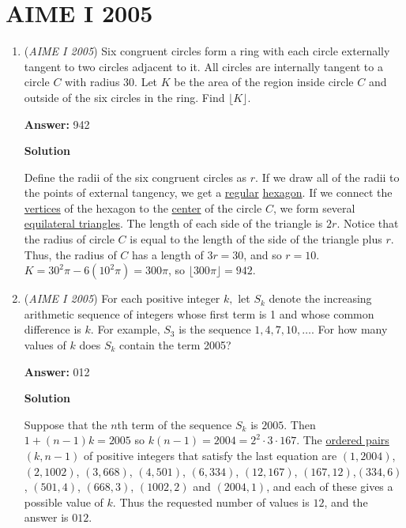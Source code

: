 \section{AIME I 2005}
        \begin{enumerate}
        	\item (\textit{AIME I 2005}) Six congruent circles form a ring with each circle externally tangent to two circles adjacent to it. All circles are internally tangent to a circle $C$ with radius 30. Let $K$ be the area of the region inside circle $C$ and outside of the six circles in the ring. Find $\lfloor K \rfloor.$

 \textbf{Answer: }942



\textbf{Solution}

Define the radii of the six congruent circles as $r$. If we draw all of the radii to the points of external tangency, we get a \href{https://artofproblemsolving.com/wiki/index.php?title=Regular\_polygon}{regular} \href{https://artofproblemsolving.com/wiki/index.php?title=Hexagon}{hexagon}. If we connect the \href{https://artofproblemsolving.com/wiki/index.php?title=Vertex}{vertices} of the hexagon to the \href{https://artofproblemsolving.com/wiki/index.php?title=Center}{center} of the circle $C$, we form several \href{https://artofproblemsolving.com/wiki/index.php?title=Equilateral\_triangle}{equilateral triangles}. The length of each side of the triangle is $2r$. Notice that the radius of circle $C$ is equal to the length of the side of the triangle plus $r$. Thus, the radius of $C$ has a length of $3r = 30$, and so $r = 10$. $K = 30^2\pi - 6(10^2\pi) = 300\pi$, so $\lfloor 300\pi \rfloor = \boxed{942}$.

 


	\item (\textit{AIME I 2005}) For each positive integer $k,$ let $S_k$ denote the increasing arithmetic sequence of integers whose first term is 1 and whose common difference is $k.$ For example, $S_3$ is the sequence $1,4,7,10,\ldots.$ For how many values of $k$ does $S_k$ contain the term 2005?


 
 \textbf{Answer: }012



\textbf{Solution}

Suppose that the $n$th term of the sequence $S_k$ is $2005$. Then $1+(n-1)k=2005$ so $k(n-1)=2004=2^2\cdot 3\cdot 167$.  The \href{https://artofproblemsolving.com/wiki/index.php?title=Ordered\_pair}{ordered pairs} $(k,n-1)$ of positive integers that satisfy the last equation are $(1,2004)$,$(2,1002)$, $(3,668)$, $(4,501)$, $(6,334)$, $(12,167)$, $(167,12)$,$(334,6)$, $(501,4)$, $(668,3)$, $(1002,2)$ and $(2004,1)$, and each of these gives a possible value of $k$. Thus the requested number of values is $12$, and the answer is $\boxed{012}$.


\end{enumerate}
